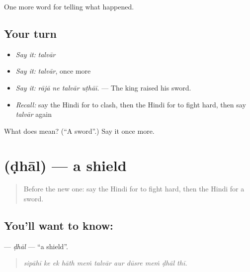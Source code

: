 \begin{grammarlens}[title={What you've built}]
One more word for telling what happened.
\end{grammarlens}

\subsection*{Your turn}
\begin{itemize}
\raggedright
  \item \emph{Say it:} \emph{talvār}
  \item \emph{Say it:} \emph{talvār}, once more
  \item \emph{Say it:} \emph{rājā ne talvār uṭhāī.} — The king raised his sword.
  \item \emph{Recall:} say the Hindi for to clash, then the Hindi for to fight hard, then say \emph{talvār} again
\end{itemize}

\begin{tcolorbox}[breakable,colback=teal!4,colframe=teal!35!black,title={Before you move on}]
What does  mean? (\textquotedblleft{}A sword\textquotedblright{}.) Say it once more.
\end{tcolorbox}
\section[\texorpdfstring{\hi{ढाल} (ḍhāl)}{ढाल (ḍhāl)}]{ (ḍhāl) — a shield}

\label{lesson:HI-C322-dhal}



\begin{quote}
Before the new one: say the Hindi for to fight hard, then the Hindi for a sword.
\end{quote}

\subsection*{You'll want to know: }
\textbf{} — \emph{ḍhāl} — \textquotedblleft{}a shield\textquotedblright{}.

\begin{quote}
          
\end{quote}

\begin{quote}
\emph{sipāhī ke ek hāth meṁ talvār aur dūsre meṁ ḍhāl thī.}
\end{quote}

